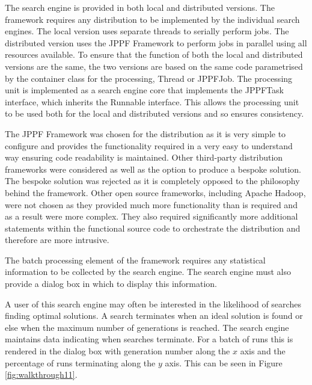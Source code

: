 The search engine is provided in both local and distributed versions.
The framework requires any distribution to be implemented by the individual search engines.
The local version uses separate threads to serially perform jobs.
The distributed version uses the JPPF Framework\cite{jppfweb} to perform jobs in parallel using all resources available.
To ensure that the function of both the local and distributed versions are the same, the two versions are based on the same code parametrised by the container class for the processing, Thread or JPPFJob.
The processing unit is implemented as a search engine core that implements the JPPFTask interface, which inherits the Runnable interface.
This allows the processing unit to be used both for the local and distributed versions and so ensures consistency.

The JPPF Framework was chosen for the distribution as it is very simple to configure and provides the functionality required in a very easy to understand way ensuring code readability is maintained.
Other third-party distribution frameworks were considered as well as the option to produce a bespoke solution.
The bespoke solution was rejected as it is completely opposed to the philosophy behind the framework.
Other open source frameworks, including Apache Hadoop\cite{apahadoop}, were not chosen as they provided much more functionality than is required and as a result were more complex.
They also required significantly more additional statements within the functional source code to orchestrate the distribution and therefore are more intrusive.

The batch processing element of the framework requires any statistical information to be collected by the search engine.
The search engine must also provide a dialog box in which to display this information.

A user of this search engine may often be interested in the likelihood of searches finding optimal solutions.
A search terminates when an ideal solution is found or else when the maximum number of generations is reached.
The search engine maintains data indicating when searches terminate.
For a batch of runs this is rendered in the dialog box with generation number along the $x$ axis and the percentage of runs terminating along the $y$ axis.
This can be seen in Figure \ref{fig:walkthrough11}.



